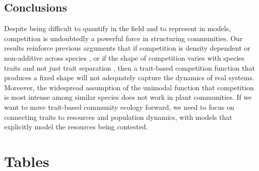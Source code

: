 \documentclass[a4paper,11pt]{article}
\begin{document}
\subsection{Conclusions}

Despite being difficult to quantify in the field and to represent in models, competition is undoubtedly a powerful force in structuring communities. Our results reinforce previous arguments that if competition is density dependent or non-additive across species \citep{Abrams-1980, Abrams-2008, Letten-2019}, or if the shape of competition varies with species traits and not just trait separation \citep{Abrams-2008, Song-2019}, then a trait-based competition function that produces a fixed shape will not adequately capture the dynamics of real systems. Moreover, the widespread assumption of the unimodal function that competition is most intense among similar species does not work in plant communities. If we want to move trait-based community ecology forward, we need to focus on connecting traits to resources and population dynamics, with models that explicitly model the resources being contested.

\clearpage

\section{Tables}
\end{document}
